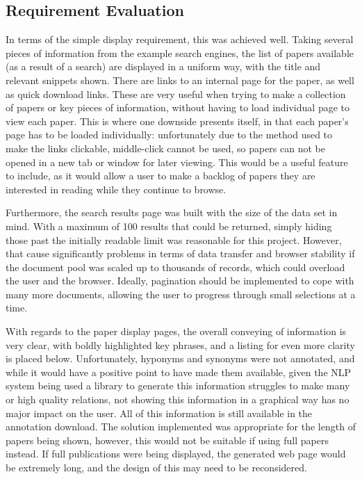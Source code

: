 \subsection*{Requirement Evaluation}
In terms of the simple display requirement, this was achieved well. Taking several pieces of information from the example search engines, the list of papers available (as a result of a search) are displayed in a uniform way, with the title and relevant snippets shown. There are links to an internal page for the paper, as well as quick download links. These are very useful when trying to make a collection of papers or key pieces of information, without having to load individual page to view each paper. This is where one downside presents itself, in that each paper's page has to be loaded individually: unfortunately due to the method used to make the links clickable, middle-click cannot be used, so papers can not be opened in a new tab or window for later viewing. This would be a useful feature to include, as it would allow a user to make a backlog of papers they are interested in reading while they continue to browse. 

Furthermore, the search results page was built with the size of the data set in mind. With a maximum of 100 results that could be returned, simply hiding those past the initially readable limit was reasonable for this project. However, that cause significantly problems in terms of data transfer and browser stability if the document pool was scaled up to thousands of records, which could overload the user and the browser. Ideally, pagination should be implemented to cope with many more documents, allowing the user to progress through small selections at a time.

With regards to the paper display pages, the overall conveying of information is very clear, with boldly highlighted key phrases, and a listing for even more clarity is placed below. Unfortunately, hyponyms and synonyms were not annotated, and while it would have a positive point to have made them available, given the NLP system being used a library to generate this information struggles to make many or high quality relations, not showing this information in a graphical way has no major impact on the user. All of this information is still available in the annotation download. The solution implemented was appropriate for the length of papers being shown, however, this would not be suitable if using full papers instead. If full publications were being displayed, the generated web page would be extremely long, and the design of this may need to be reconsidered.

